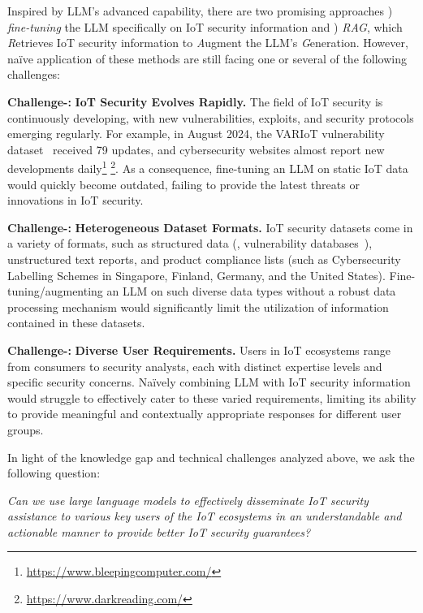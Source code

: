 Inspired by LLM's advanced capability, there are two promising approaches ) \textit{fine-tuning} the LLM specifically on IoT security information and ) \textit{RAG}, which \textit{R}etrieves IoT security information to \textit{A}ugment the LLM's \textit{G}eneration. 
However, na\"{i}ve application of these methods are still facing one or several of the following challenges:

\noindent \textbf{Challenge-:} \textbf{IoT Security Evolves Rapidly.}
The field of IoT security is continuously developing, with new vulnerabilities, exploits, and security protocols emerging regularly. 
For example, in August 2024, the VARIoT vulnerability dataset~\cite{VARIoT_db} received 79 updates, and cybersecurity websites almost report new developments daily\footnote{\scriptsize \url{https://www.bleepingcomputer.com/}} \footnote{\scriptsize \url{https://www.darkreading.com/}}.
As a consequence, fine-tuning an LLM on static IoT data would quickly become outdated, failing to provide the latest threats or innovations in IoT security.

\noindent \textbf{Challenge-:} \textbf{Heterogeneous Dataset Formats.} 
IoT security datasets come in a variety of formats, such as structured data (\eg, vulnerability databases~\cite{VARIoT_db}), unstructured text reports, and product compliance lists (such as Cybersecurity Labelling Schemes in Singapore, Finland, Germany, and the United States).
Fine-tuning/augmenting an LLM on such diverse data types without a robust data processing mechanism would significantly limit the utilization of information contained in these datasets.

\noindent \textbf{Challenge-:} \textbf{Diverse User Requirements.} 
Users in IoT ecosystems range from consumers to security analysts, each with distinct expertise levels and specific security concerns. 
Na\"{i}vely combining LLM with IoT security information would struggle to effectively cater to these varied requirements, limiting its ability to provide meaningful and contextually appropriate responses for different user groups.

In light of the knowledge gap and technical challenges analyzed above, we ask the following question: 

\textit{Can we use large language models to effectively disseminate IoT security assistance to various key users of the IoT ecosystems in an understandable and actionable manner to provide better IoT security guarantees?}


